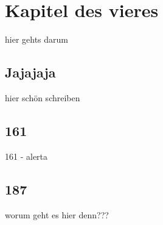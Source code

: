 \chapter{Kapitel des vieres}
\label{chapter:kapitel4}
hier gehts darum

\section{Jajajaja}
\label{section:i}

hier schön schreiben

\section{161}
\label{section:l}

161 - alerta

\section{187}
\label{section:1}

worum geht es hier denn???
